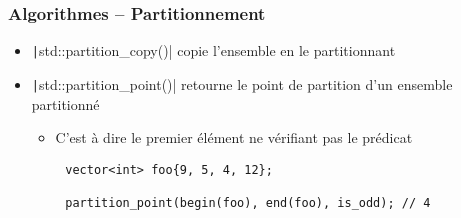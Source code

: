 \documentclass[C++.tex]{subfiles}
\begin{document}
\begin{frame}[fragile]
	\frametitle{Algorithmes -- Partitionnement}
	\begin{itemize}
		\item \texttt|std::partition_copy()| copie l'ensemble en le partitionnant
		\item \texttt|std::partition_point()| retourne le point de partition d'un ensemble partitionné
		\begin{itemize}
			\item C'est à dire le premier élément ne vérifiant pas le prédicat
		\end{itemize}
	\end{itemize}

	\begin{verbatim}
		vector<int> foo{9, 5, 4, 12};

		partition_point(begin(foo), end(foo), is_odd); // 4
	\end{verbatim}

\end{frame}
\end{document}
